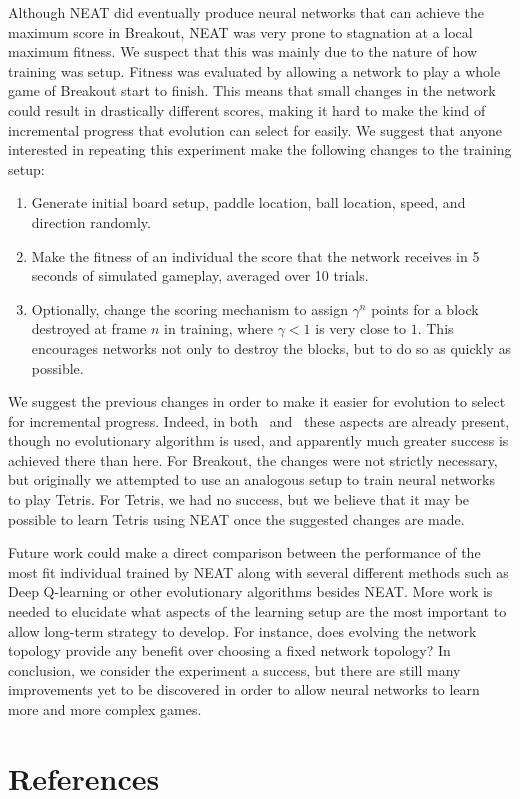 \documentclass[letterpaper, twocolumn]{article}
\begin{document}
Although NEAT did eventually produce neural networks that can achieve the maximum score
in Breakout, NEAT was very prone to stagnation at a local maximum fitness.
We suspect that this was mainly due to the nature of how training was setup.
Fitness was evaluated by allowing a network to play a whole game of Breakout start to finish.
This means that small changes in the network could result in drastically different scores, making it hard
to make the kind of incremental progress that evolution can select for easily.
We suggest that anyone interested in repeating this experiment make the following changes to
the training setup:
\begin{enumerate}
    \item{} Generate initial board setup, paddle location, ball location, speed, and direction randomly.
    \item{} Make the fitness of an individual the score that the network receives in 5 seconds of simulated gameplay, averaged over 10 trials.
    \item{} Optionally, change the scoring mechanism to assign $\gamma^n$ points for a block destroyed
        at frame $n$ in training, where $\gamma<1$ is very close to $1$. 
        This encourages networks not only to destroy the blocks, but to do so as quickly as possible.
\end{enumerate}

We suggest the previous changes in order to make it easier for evolution to select for incremental progress.
Indeed, in both~\cite{mnih2013playing} and~\cite{mnih2015human} these aspects are already present,
though no evolutionary algorithm is used, and apparently much greater success is achieved there than here.
For Breakout, the changes were not strictly necessary, but originally we attempted to use an analogous
setup to train neural networks to play Tetris.
For Tetris, we had no success, but we believe that it may be possible to learn Tetris using NEAT
once the suggested changes are made.

Future work could make a direct comparison between the performance of the most fit individual trained by
NEAT along with several different methods such as Deep Q-learning or other
evolutionary algorithms besides NEAT.
More work is needed to elucidate what aspects of the learning setup are the most important to allow
long-term strategy to develop. For instance, does evolving the network topology provide any benefit over
choosing a fixed network topology?
In conclusion, we consider the experiment a success, but there are
still many improvements yet to be discovered in order to allow neural networks
to learn more and more complex games.

\begingroup
    \section{References}
    \renewcommand{\section}[2]{}
    \nocite{*}
    
    \begin{raggedright}
    
    \end{raggedright}
\endgroup
\end{document}

